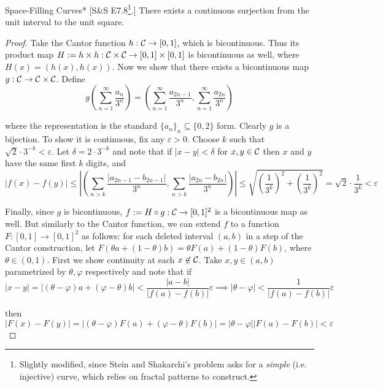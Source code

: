 \begin{problem}{Space-Filling Curves}*
    [S\&S E7.8\footnote{Slightly modified, since Stein and Shakarchi's problem asks for a \textit{simple} (i.e. injective) curve, which relies on fractal patterns to construct.}.] There exists a continuous surjection from the unit interval to the unit square.
\end{problem}

\begin{proof}
    Take the Cantor function $h : \mathcal{C} \to [0, 1]$, which is bicontinuous. Thus its product map $H := h \times h : \mathcal{C} \times \mathcal{C} \to [0,1] \times [0,1]$ is bicontinuous as well, where $H(x) = (h(x), h(x))$. Now we show that there exists a bicontinuous map $g : \mathcal{C} \to \mathcal{C} \times \mathcal{C}$. Define
    $$
        g \left( \sum_{n=1}^\infty \frac{a_n}{3^n} \right) 
        = \left( \sum_{n=1}^\infty \frac{a_{2n-1}}{3^n}, \sum_{n=1}^\infty \frac{a_{2n}}{3^n} \right)
    $$

    where the representation is the standard $\{a_n\}_n \subseteq \{0, 2\}$ form. Clearly $g$ is a bijection. To show it is continuous, fix any $\varepsilon > 0$. Choose $k$ such that $\sqrt{2} \cdot 3^{-k} < \varepsilon$. Let $\delta = 2 \cdot 3^{-k}$ and note that if $|x - y| < \delta$ for $x,y \in \mathcal{C}$ then $x$ and $y$ have the same first $k$ digits, and 
    $$
        |f(x) - f(y)|
        \leq \left| \left( \sum_{n > k} \frac{|a_{2n-1} - b_{2n-1}|}{3^n}, \sum_{n > k} \frac{|a_{2n} - b_{2n}|}{3^n} \right) \right| 
        \leq \sqrt{\left(\frac{1}{3^k}\right)^2 + \left(\frac{1}{3^k} \right)^2}
        = \sqrt{2} \cdot \frac{1}{3^k} 
        < \varepsilon
    $$

    Finally, since $g$ is bicontinuous, $f := H \circ g : \mathcal{C} \to [0, 1]^2$ is a bicontinuous map as well. But similarly to the Cantor function, we can extend $f$ to a function $F : [0, 1] \to [0, 1]^2$ as follows: for each deleted interval $(a, b)$ in a step of the Cantor construction, let $F(\theta a + (1 - \theta)b) = \theta F(a) + (1 - \theta) F(b)$, where $\theta \in (0, 1)$. First we show continuity at each $x \not\in \mathcal{C}$. Take $x, y \in (a, b)$ parametrized by $\theta, \varphi$ respectively and note that if
    $$
        |x - y| = |(\theta - \varphi)a + (\varphi - \theta)b| 
        < \frac{|a - b|}{|f(a) - f(b)|} \varepsilon
        \implies |\theta - \varphi| < \frac{1}{|f(a) - f(b)|} \varepsilon
    $$

    then 
    $$
        |F(x) - F(y)|
        = |(\theta - \varphi) F(a) + (\varphi - \theta) F(b)|
        = |\theta - \varphi| |F(a) - F(b)|
        < \varepsilon
    $$


\end{proof}
